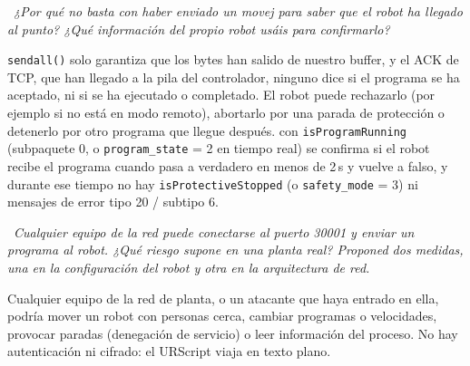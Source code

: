 \documentclass[10pt,a4paper]{article}
\newcommand{\code}[1]{\texttt{\small #1}}
\newcommand{\preg}[2]{\par\smallskip\noindent{\color{azul}\bfseries P#1.}~{\itshape #2}\par\nopagebreak}
\begin{document}
\preg{9}{¿Por qué no basta con haber enviado un movej para saber que el robot ha llegado al
punto? ¿Qué información del propio robot usáis para confirmarlo?}
\code{sendall()} solo garantiza que los bytes han salido de nuestro buffer, y el ACK de TCP, que han llegado a la pila del controlador, ninguno dice si el programa se ha aceptado, ni si se ha ejecutado o completado. El robot puede rechazarlo (por ejemplo si no está en modo remoto), abortarlo por una parada de protección o detenerlo por otro programa que llegue después. con \code{isProgramRunning} (subpaquete 0, o \code{program\_state} = 2 en tiempo real) se confirma si el robot recibe el programa cuando pasa a verdadero en menos de 2\,s y vuelve a falso, y durante ese tiempo no hay \code{isProtectiveStopped} (o \code{safety\_mode} = 3) ni mensajes de error tipo 20 / subtipo 6.

\preg{10}{Cualquier equipo de la red puede conectarse al puerto 30001 y enviar un programa
al robot. ¿Qué riesgo supone en una planta real? Proponed dos medidas, una en la
configuración del robot y otra en la arquitectura de red.}
Cualquier equipo de la red de planta, o un atacante que haya entrado en ella, podría mover un robot con personas cerca, cambiar programas o velocidades, provocar paradas (denegación de servicio) o leer información del proceso. No hay autenticación ni cifrado: el URScript viaja en texto plano. 
\end{document}
